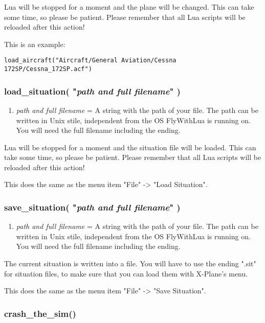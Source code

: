 \documentclass[11pt,parskip=half,a4paper]{scrartcl}
\begin{document}
Lua will be stopped for a moment and the plane will be changed. This can take some time, so please be patient. Please remember that all Lua scripts will be reloaded after this action!

This is an example:
\begin{lstlisting}
load_aircraft("Aircraft/General Aviation/Cessna 172SP/Cessna_172SP.acf")
\end{lstlisting}

\subsubsection{load\_situation( "\emph{path and full filename}" )}

\begin{enumerate}
	\item \emph{path and full filename} = A string with the path of your file. The path can be written in Unix stile, independent from the OS FlyWithLua is running on. You will need the full filename including the ending.
\end{enumerate}

Lua will be stopped for a moment and the situation file will be loaded. This can take some time, so please be patient. Please remember that all Lua scripts will be reloaded after this action!

This does the same as the menu item "File" -> "Load Situation".

\subsubsection{save\_situation( "\emph{path and full filename}" )}

\begin{enumerate}
	\item \emph{path and full filename} = A string with the path of your file. The path can be written in Unix stile, independent from the OS FlyWithLua is running on. You will need the full filename including the ending.
\end{enumerate}

The current situation is written into a file. You will have to use the ending ".sit" for situation files, to make sure that you can load them with X-Plane's menu.

This does the same as the menu item "File" -> "Save Situation".

\subsubsection{crash\_the\_sim()}
\end{document}
